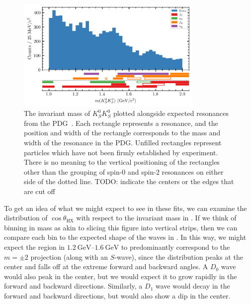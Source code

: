 \begin{figure}
  \begin{center}
    \includegraphics[width=0.8\textwidth]{figures/mass_pdg_data_accpol_chisqdof_3.4_splot_D_1s_2b.png}
  \end{center}
  \caption{The invariant mass of $K_S^0K_S^0$ plotted alongside expected resonances from the PDG~\cite{Zyla2020}. Each rectangle represents a resonance, and the position and width of the rectangle corresponds to the mass and width of the resonance in the PDG. Unfilled rectangles represent particles which have not been firmly established by experiment. There is no meaning to the vertical positioning of the rectangles other than the grouping of spin-$0$ and spin-$2$ resonances on either side of the dotted line. {\color{red}TODO: indicate the centers or the edges that are cut off}}\label{fig:mass-with-pdg}
\end{figure}

To get an idea of what we might expect to see in these fits, we can examine the distribution of $\cos\theta_\text{HX}$ with respect to the invariant mass in . If we think of binning in mass as akin to slicing this figure into vertical strips, then we can compare each bin to the expected shape of the waves in . In this way, we might expect the region in $\qtyrange{1.2}{1.6}{\giga\electronvolt}$ to predominantly correspond to the $m=\pm 2$ projection (along with an $S$-wave), since the distribution peaks at the center and falls off at the extreme forward and backward angles. A $D_0$ wave would also peak in the center, but we would expect it to grow rapidly in the forward and backward directions. Similarly, a $D_1$ wave would decay in the forward and backward directions, but would also show a dip in the center.

